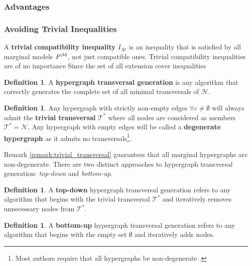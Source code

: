 \documentclass[aps, 10pt, english, twoside, pra, nofootinbib, longbibliography]{revtex4-1}
\theoremstyle{plain}
\theoremstyle{definition}
\newtheorem{definition}[theorem]{Definition}
\theoremstyle{remark}
\newcommand{\nodes}{\mathcal{N}}
\newcommand{\trans}{\mathcal{T}}
\newcommand{\mscenario}{\mathcal{M}}
\newcommand{\term}[1]{\textcolor{Mahogany}{\textbf{#1}}}
\begin{document}
    \subsubsection{Advantages}


    \subsubsection{Avoiding Trivial Inequalities}
    A \term{trivial compatibility inequality} $I_{\mscenario}$ is an inequality that is satisfied by all marginal models $\prob^{\mscenario}$, not just compatible ones. Trivial compatibility inequalities are of no importance Since the set of all extension cover inequalities

    \begin{definition}
        A \term{hypergraph transversal generation} is any algorithm that correctly generates the complete set of all minimal transversals of $\mathcal{H}$.
    \end{definition}

    \begin{definition}
        Any hypergraph with strictly non-empty edges $\forall e \neq \emptyset$ will always admit the \term{trivial transversal} $\trans^*$ where all nodes are considered as members $\trans^* = \nodes$. Any hypergraph with empty edges will be called a \term{degenerate hypergraph} as it admits no transversals\footnote{Most authors require that all hypergraphs be non-degenerate \cite{Kavvadias_2005}.}.
    \end{definition}
    Remark \ref{remark:trivial_transversal} guarantees that all marginal hypergraphs are non-degenerate. There are two distinct approaches to hypergraph transversal generation: \textit{top-down} and \textit{bottom-up}.
    \begin{definition}
        A \term{top-down} hypergraph transversal generation refers to any algorithm that begins with the trivial transversal $\trans^*$ and iteratively removes unnecessary nodes from $\trans^*$.
    \end{definition}

    \begin{definition}
        A \term{bottom-up} hypergraph transversal generation refers to any algorithm that begins with the empty set $\emptyset$ and iteratively adds nodes.
    \end{definition}
\end{document}
